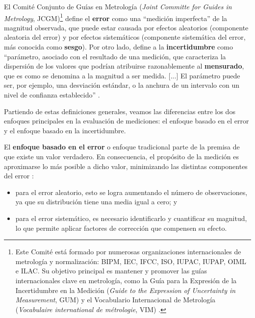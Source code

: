El Comité Conjunto de Guías en Metrología (\textit{Joint Committe for Guides in Metrology}, JCGM)\footnote{
    Este Comité está formado por numerosas organizaciones internacionales de metrología y normalización: 
    BIPM, IEC, IFCC, ISO, IUPAC, IUPAP, OIML e ILAC. Su objetivo principal es mantener y promover las 
    guías internacionales clave en metrología, como la Guía para la Expresión de la Incertidumbre en la 
    Medición (\textit{Guide to the Expression of Uncertainty in Measurement}, GUM) \cite{jcgm100:2008} y el 
    Vocabulario Internacional de Metrología (\textit{Vocabulaire international de métrologie}, VIM) 
    \cite{jcgm200:2012}.
}
define el \textbf{error} como una ``medición imperfecta'' de la magnitud observada, que puede estar causada
por efectos aleatorios (componente aleatoria del error) y por efectos sistemáticos (componente sistemática del 
error, más conocida como \textbf{sesgo}).
Por otro lado, define a la \textbf{incertidumbre} como ``parámetro, asociado con el resultado de una medición, 
que caracteriza la dispersión de los valores que podrían atribuirse razonablemente al \textbf{mensurado}, que
es como se denomina a la magnitud a ser medida. [...] El parámetro puede ser, por ejemplo, una desviación 
estándar, o la anchura de un intervalo con un nivel de confianza establecido'' \cite{jcgm100:2008}.

Partiendo de estas definiciones generales, veamos las diferencias entre los dos enfoques principales en la 
evaluación de mediciones: el enfoque basado en el error y el enfoque basado en la incertidumbre.

El \textbf{enfoque basado en el error} o enfoque tradicional parte de la premisa de que existe un valor 
verdadero. En consecuencia, el propósito de la medición es aproximarse lo más posible a dicho valor, 
minimizando las distintas componentes del error \cite{jcgm100:2008}:

\begin{itemize}
    \item para el error aleatorio, esto se logra aumentando el número de observaciones, ya que su distribución 
    tiene una media igual a cero; y

    \item para el error sistemático, es necesario identificarlo y cuantificar su magnitud, lo que permite 
    aplicar factores de corrección que compensen su efecto.

\end{itemize}

